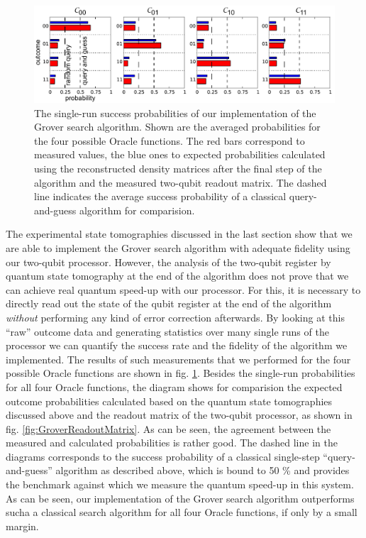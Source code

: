 \begin{figure}[ht!]
	\centering
		\includegraphics[width=1.\textwidth]{"./data/ct5/2011_04_21 - grover and tomo/good_data/grover algorithm - single run probabilities"}
		\caption[Single-run success probabilities of the Grover search algorithm]{The single-run success probabilities of our implementation of the Grover search algorithm. Shown are the averaged probabilities for the four possible Oracle functions. The red bars correspond to measured values, the blue ones to expected probabilities calculated using the reconstructed density matrices after the final step of the algorithm and the measured two-qubit readout matrix. The dashed line indicates the average success probability of a classical query-and-guess algorithm for comparision.}
	\label{fig:GroverSingleShotResults}
\end{figure}
The experimental state tomographies discussed in the last section show that we are able to implement the Grover search algorithm with adequate fidelity using our two-qubit processor. However, the analysis of the two-qubit register by quantum state tomography at the end of the algorithm does not prove that we can achieve real quantum speed-up with our processor. For this, it is necessary to directly read out the state of the qubit register at the end of the algorithm {\it without} performing any kind of error correction afterwards. By looking at this ``raw'' outcome data and generating statistics over many single runs of the processor we can quantify the success rate and the fidelity of the algorithm we implemented. The results of such measurements that we performed for the four possible Oracle functions are shown in fig. \ref{fig:GroverSingleShotResults}. Besides the single-run probabilities for all four Oracle functions, the diagram shows for comparision the expected outcome probabilities calculated based on the quantum state tomographies discussed above and the readout matrix of the two-qubit processor, as shown in fig. \ref{fig:GroverReadoutMatrix}. As can be seen, the agreement between the measured and calculated probabilities is rather good. The dashed line in the diagrams corresponds to the success probability of a classical single-step ``query-and-guess'' algorithm as described above, which is bound to 50 \% and provides the benchmark against which we measure the quantum speed-up in this system. As can be seen, our implementation of the Grover search algorithm outperforms sucha a classical search algorithm for all four Oracle functions, if only by a small margin.


